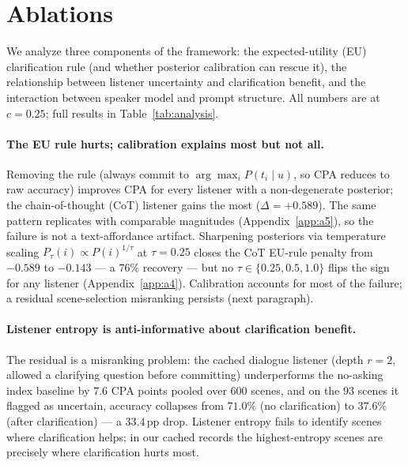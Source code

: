 \documentclass[11pt]{article}
\begin{document}
\section{Ablations}
\label{sec:analysis}

We analyze three components of the framework: the expected-utility (EU)
clarification rule (and whether posterior calibration can rescue it),
the relationship between listener uncertainty and clarification benefit,
and the interaction between speaker model and prompt structure. All
numbers are at $c{=}0.25$; full results in Table~\ref{tab:analysis}.

\paragraph{The EU rule hurts; calibration explains most but not all.}
Removing the rule (always commit to $\arg\max_i P(t_i \mid u)$, so CPA
reduces to raw accuracy) improves CPA for every listener with a
non-degenerate posterior; the chain-of-thought (CoT) listener gains the
most ($\Delta{=}{+}0.589$). The same pattern replicates with comparable
magnitudes (Appendix~\ref{app:a5}), so the failure is not
a text-affordance artifact. Sharpening posteriors via temperature scaling
$P_\tau(i) \propto P(i)^{1/\tau}$ at $\tau{=}0.25$ closes the CoT EU-rule
penalty from $-0.589$ to $-0.143$ --- a $76\%$ recovery --- but no
$\tau \in \{0.25, 0.5, 1.0\}$ flips the sign for any listener
(Appendix~\ref{app:a4}). Calibration accounts for most of the failure; a residual
scene-selection misranking persists (next paragraph).

\paragraph{Listener entropy is anti-informative about clarification benefit.}
The residual is a misranking problem: the cached
dialogue listener (depth $r{=}2$, allowed a clarifying question before
committing) underperforms the no-asking index baseline by $7.6$ CPA
points pooled over $600$ scenes, and on the $93$ scenes it flagged as
uncertain, accuracy collapses from $71.0\%$ (no clarification) to
$37.6\%$ (after clarification) --- a $33.4$\,pp drop.
Listener entropy fails to identify scenes where clarification helps;
in our cached records the highest-entropy scenes are precisely where
clarification hurts most.
\end{document}
